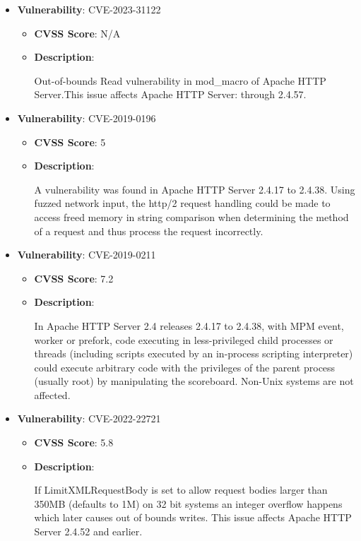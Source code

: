 \documentclass{article}
\begin{document}
\begin{itemize}
        \item \textbf{Vulnerability}: CVE-2023-31122
        \begin{itemize}
            \item \textbf{CVSS Score}:  N/A 
            \item \textbf{Description}:
            \parbox[t]{0.9\linewidth}{
                \ttfamily Out-of-bounds Read vulnerability in mod\_macro of Apache HTTP Server.This issue affects Apache HTTP Server: through 2.4.57.
            }
        \end{itemize}
    
        \item \textbf{Vulnerability}: CVE-2019-0196
        \begin{itemize}
            \item \textbf{CVSS Score}:  5 
            \item \textbf{Description}:
            \parbox[t]{0.9\linewidth}{
                \ttfamily A vulnerability was found in Apache HTTP Server 2.4.17 to 2.4.38. Using fuzzed network input, the http/2 request handling could be made to access freed memory in string comparison when determining the method of a request and thus process the request incorrectly.
            }
        \end{itemize}
    
        \item \textbf{Vulnerability}: CVE-2019-0211
        \begin{itemize}
            \item \textbf{CVSS Score}:  7.2 
            \item \textbf{Description}:
            \parbox[t]{0.9\linewidth}{
                \ttfamily In Apache HTTP Server 2.4 releases 2.4.17 to 2.4.38, with MPM event, worker or prefork, code executing in less-privileged child processes or threads (including scripts executed by an in-process scripting interpreter) could execute arbitrary code with the privileges of the parent process (usually root) by manipulating the scoreboard. Non-Unix systems are not affected.
            }
        \end{itemize}
    
        \item \textbf{Vulnerability}: CVE-2022-22721
        \begin{itemize}
            \item \textbf{CVSS Score}:  5.8 
            \item \textbf{Description}:
            \parbox[t]{0.9\linewidth}{
                \ttfamily If LimitXMLRequestBody is set to allow request bodies larger than 350MB (defaults to 1M) on 32 bit systems an integer overflow happens which later causes out of bounds writes. This issue affects Apache HTTP Server 2.4.52 and earlier.
            }
        \end{itemize}
    

\end{itemize}
\end{document}
